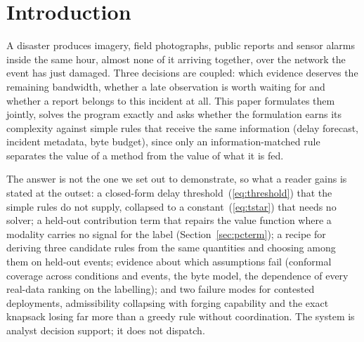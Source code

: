 \section{Introduction}
A disaster produces imagery, field photographs, public reports and sensor alarms inside the same hour, almost none of it arriving together, over the network the event has just damaged. Three decisions are coupled: which evidence deserves the remaining bandwidth, whether a late observation is worth waiting for and whether a report belongs to this incident at all. This paper formulates them jointly, solves the program exactly and asks whether the formulation earns its complexity against simple rules that receive the same information (delay forecast, incident metadata, byte budget), since only an information-matched rule separates the value of a method from the value of what it is fed.

The answer is not the one we set out to demonstrate, so what a reader gains is stated at the outset: a closed-form delay threshold~(\ref{eq:threshold}) that the simple rules do not supply, collapsed to a constant~(\ref{eq:tstar}) that needs no solver; a held-out contribution term that repairs the value function where a modality carries no signal for the label (Section~\ref{sec:pcterm}); a recipe for deriving three candidate rules from the same quantities and choosing among them on held-out events; evidence about which assumptions fail (conformal coverage across conditions and events, the byte model, the dependence of every real-data ranking on the labelling); and two failure modes for contested deployments, admissibility collapsing with forging capability and the exact knapsack losing far more than a greedy rule without coordination. The system is analyst decision support; it does not dispatch.

